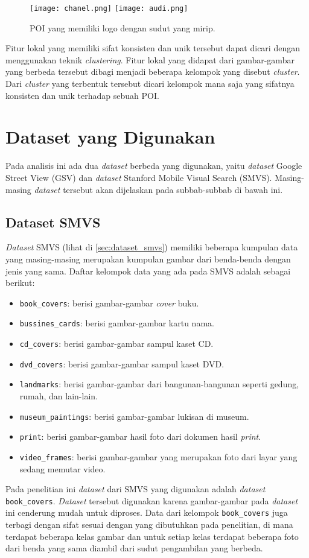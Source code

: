 \begin{figure}[H]
	\centering
	\texttt{[image: chanel.png]}
	\texttt{[image: audi.png]}
	\caption{POI yang memiliki logo dengan sudut yang mirip.}
	\label{fig:logo_tidak_unik}
\end{figure}

Fitur lokal yang memiliki sifat konsisten dan unik tersebut dapat dicari dengan menggunakan teknik \textit{clustering}. Fitur lokal yang didapat dari gambar-gambar yang berbeda tersebut dibagi menjadi beberapa kelompok yang disebut \textit{cluster}. Dari \textit{cluster} yang terbentuk tersebut dicari kelompok mana saja yang sifatnya konsisten dan unik terhadap sebuah POI. 

\section{Dataset yang Digunakan}
Pada analisis ini ada dua \textit{dataset} berbeda yang digunakan, yaitu \textit{dataset} Google Street View (GSV) dan \textit{dataset} Stanford Mobile Visual Search (SMVS). Masing-masing \textit{dataset} tersebut akan dijelaskan pada subbab-subbab di bawah ini.
\subsection{Dataset SMVS}
\label{subsec:dataset_smvs}
\textit{Dataset} SMVS (lihat di \ref{sec:dataset_smvs}) memiliki beberapa kumpulan data yang masing-masing merupakan kumpulan gambar dari benda-benda dengan jenis yang sama. Daftar kelompok data yang ada pada SMVS adalah sebagai berikut:
\begin{itemize}
	\item \texttt{book\_covers}: berisi gambar-gambar \textit{cover} buku.
	\item \texttt{bussines\_cards}: berisi gambar-gambar kartu nama.
	\item \texttt{cd\_covers}: berisi gambar-gambar sampul kaset CD.
	\item \texttt{dvd\_covers}: berisi gambar-gambar sampul kaset DVD.
	\item \texttt{landmarks}: berisi gambar-gambar dari bangunan-bangunan seperti gedung, rumah, dan lain-lain.
	\item \texttt{museum\_paintings}: berisi gambar-gambar lukisan di museum.
	\item \texttt{print}: berisi gambar-gambar hasil foto dari dokumen hasil \textit{print}.
	\item \texttt{video\_frames}: berisi gambar-gambar yang merupakan foto dari layar yang sedang memutar video.
\end{itemize}
Pada penelitian ini \textit{dataset} dari SMVS yang digunakan adalah \textit{dataset} \texttt{book\_covers}. \textit{Dataset} tersebut digunakan karena gambar-gambar pada \textit{dataset} ini cenderung mudah untuk diproses. Data dari kelompok \texttt{book\_covers} juga terbagi dengan sifat sesuai dengan yang dibutuhkan pada penelitian, di mana terdapat beberapa kelas gambar dan untuk setiap kelas terdapat beberapa foto dari benda yang sama diambil dari sudut pengambilan yang berbeda. 

